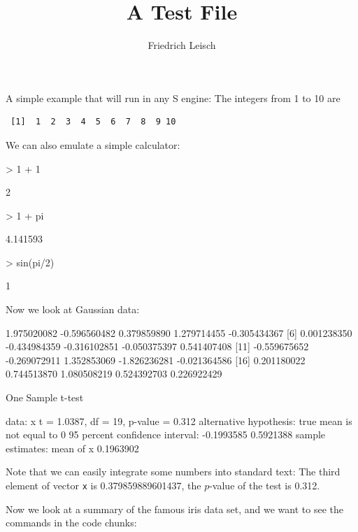\documentclass[a4paper]{article}
\title{A Test File}
\author{Friedrich Leisch}
\begin{document}
\maketitle

A simple example that will run in any S engine: The integers from 1 to
10 are
\begin{Verbatim}
 [1]  1  2  3  4  5  6  7  8  9 10
\end{Verbatim}

We can also emulate a simple calculator:
\begin{Schunk}
\begin{Sinput}
> 1 + 1
\end{Sinput}
\begin{Soutput}
[1] 2
\end{Soutput}
\begin{Sinput}
> 1 + pi
\end{Sinput}
\begin{Soutput}
[1] 4.141593
\end{Soutput}
\begin{Sinput}
> sin(pi/2)
\end{Sinput}
\begin{Soutput}
[1] 1
\end{Soutput}
\end{Schunk}

Now we look at Gaussian data:

\begin{Schunk}
\begin{Soutput}
 [1]  1.975020082 -0.596560482  0.379859890  1.279714455 -0.305434367
 [6]  0.001238350 -0.434984359 -0.316102851 -0.050375397  0.541407408
[11] -0.559675652 -0.269072911  1.352853069 -1.826236281 -0.021364586
[16]  0.201180022  0.744513870  1.080508219  0.524392703  0.226922429
\end{Soutput}
\begin{Soutput}
	One Sample t-test

data:  x 
t = 1.0387, df = 19, p-value = 0.312
alternative hypothesis: true mean is not equal to 0 
95 percent confidence interval:
 -0.1993585  0.5921388 
sample estimates:
mean of x 
0.1963902 
\end{Soutput}
\end{Schunk}
Note that we can easily integrate some numbers into standard text: The
third element of vector \texttt{x} is 0.379859889601437, the
$p$-value of the test is 0.312. %

Now we look at a summary of the famous iris data set, and we want to
see the commands in the code chunks:
\end{document}
